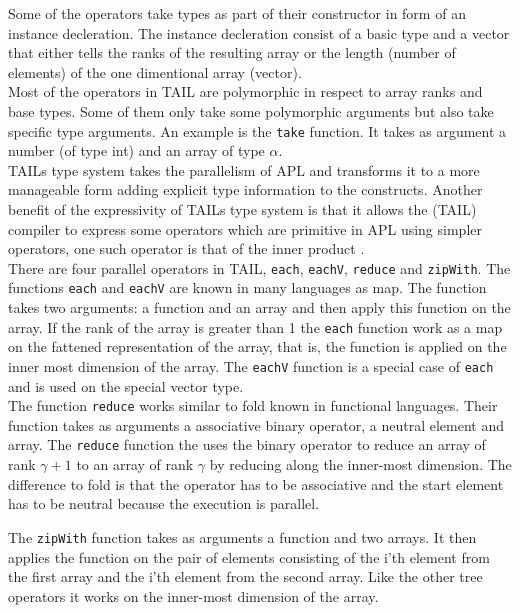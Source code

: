 \documentclass[11pt]{article}
\begin{document}
Some of the operators take types as part of their constructor in form of an instance decleration. 
The instance decleration consist of a basic type and a vector that either tells the ranks of 
the resulting array or the length (number of elements) of the one dimentional array (vector).\\

Most of the operators in TAIL are polymorphic in respect to array ranks and base types.
Some of them only take some polymorphic arguments but also take specific type arguments.
An example is the {\tt take} function. It takes as argument a number (of type int) and an array of type $\alpha$.\\

 TAILs type system takes the parallelism of APL and transforms it to a more manageable form adding explicit type
 information to the constructs.
Another benefit of the expressivity of TAILs type system is that it allows the (TAIL) compiler to express some operators which
are primitive in APL using simpler operators, one such operator is that of the inner product \cite{ElsmanDybdal:Array:2014}. \\

There are four parallel operators in TAIL, {\tt each}, {\tt eachV}, {\tt reduce} and {\tt zipWith}.
The functions {\tt each} and {\tt eachV} are known in many languages as map.
The function takes two arguments: a function and an array and then apply this function on the array.
If the rank of the array is greater than 1 the {\tt each} function work as a map on the fattened representation of the array,
that is, the function is applied on the inner most dimension of the array.
The {\tt eachV} function is a special case of {\tt each} and is used on the special vector type.\\

The function {\tt reduce} works similar to fold known in functional languages.
Their function takes as arguments a associative binary operator, a neutral element and array.
The {\tt reduce} function the uses the binary operator 
to reduce an array of rank $\gamma+1$ to an array of rank $\gamma$ by reducing along the inner-most dimension.
The difference to fold is that the operator has to be associative and the start element has to be neutral
because the execution is parallel.

The {\tt zipWith} function takes as arguments a function and two arrays.
It then applies the function on the pair of elements consisting of the i'th element
from the first array and the i'th element from the second array.
Like the other tree operators it works on the inner-most dimension of the array\cite{ElsmanDybdal:Array:2014}.
\end{document}
